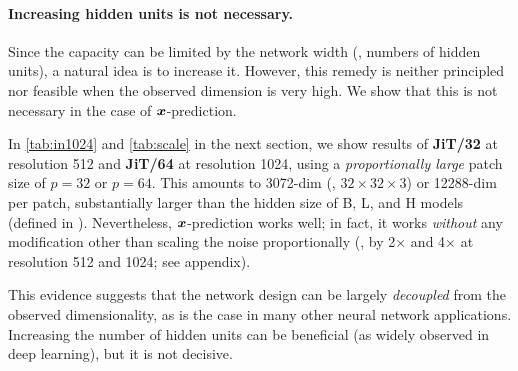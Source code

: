 \paragraph{Increasing hidden units is not necessary.} Since the capacity can be limited by the network width (\ie, numbers of hidden units), a natural idea is to increase it. 
However, this remedy is neither principled nor feasible when the observed dimension is very high. We show that this is not necessary in the case of $\bm{x}$-prediction.

In \cref{tab:in1024} and \cref{tab:scale} in the next section, we show results of \textbf{JiT/32} at resolution 512 and \textbf{JiT/64} at resolution 1024, 
using a \textit{proportionally large} patch size of $p{=}32$ or $p{=}64$.
This amounts to 3072-dim (\ie, $32{\times}32{\times}3$) or 12288-dim
per patch, substantially larger than the hidden size of B, L, and H models (defined in \cite{Dosovitskiy2021}).
Nevertheless, $\bm{x}$-prediction works well; in fact, it works \textit{without} any modification other than scaling the noise proportionally (\eg, by 2$\times$ and 4$\times$ at resolution 512 and 1024; see appendix).

This evidence suggests that the network design can be largely \textit{decoupled} from the observed dimensionality, as is the case in many other neural network applications. Increasing the number of hidden units can be beneficial (as widely observed in deep learning), but it is not decisive.

